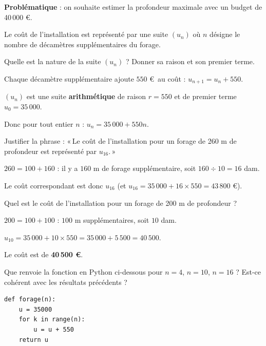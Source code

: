 \documentclass[12pt,a4paper]{book}
\begin{document}
\noindent\textbf{Problématique} : on souhaite estimer la profondeur maximale avec un budget de 40\,000 \euro.

\begin{enumMet}
	\item Le coût de l'installation est représenté par une suite $(u_n)$ où $n$ désigne le nombre de décamètres supplémentaires du forage.
	\begin{enumMet}
		\item Quelle est la nature de la suite $(u_n)$ ? Donner sa raison et son premier terme.

		\begin{corrBox}
			Chaque décamètre supplémentaire ajoute $550$ \euro\ au coût : $u_{n+1}=u_n+550$.

			$(u_n)$ est une suite \textbf{arithmétique} de raison $r=550$ et de premier terme $u_0=35\,000$.

			Donc pour tout entier $n$ : $u_n=35\,000+550n$.
		\end{corrBox}
		\item Justifier la phrase : «\,Le coût de l'installation pour un forage de 260 m de profondeur est représenté par $u_{16}$.\,»

		\begin{corrBox}
			$260=100+160$ : il y a $160$ m de forage supplémentaire, soit $160\div 10=16$ dam.

			Le coût correspondant est donc $u_{16}$ (et $u_{16}=35\,000+16\times 550=43\,800$ \euro).
		\end{corrBox}
		\item Quel est le coût de l'installation pour un forage de 200 m de profondeur ?

		\begin{corrBox}
			$200=100+100$ : $100$ m supplémentaires, soit $10$ dam.

			$u_{10}=35\,000+10\times 550=35\,000+5\,500=40\,500$.

			Le coût est de \textbf{40\,500 \euro}.
		\end{corrBox}
	\end{enumMet}
	\item Que renvoie la fonction en Python ci-dessous pour $n=4$, $n=10$, $n=16$ ? Est-ce cohérent avec les résultats précédents ?

\begin{center}
\begin{minipage}{0.55\linewidth}
\begin{verbatim}
def forage(n):
    u = 35000
    for k in range(n):
        u = u + 550
    return u
\end{verbatim}
\end{minipage}
\end{center}


\end{enumMet}
\end{document}
